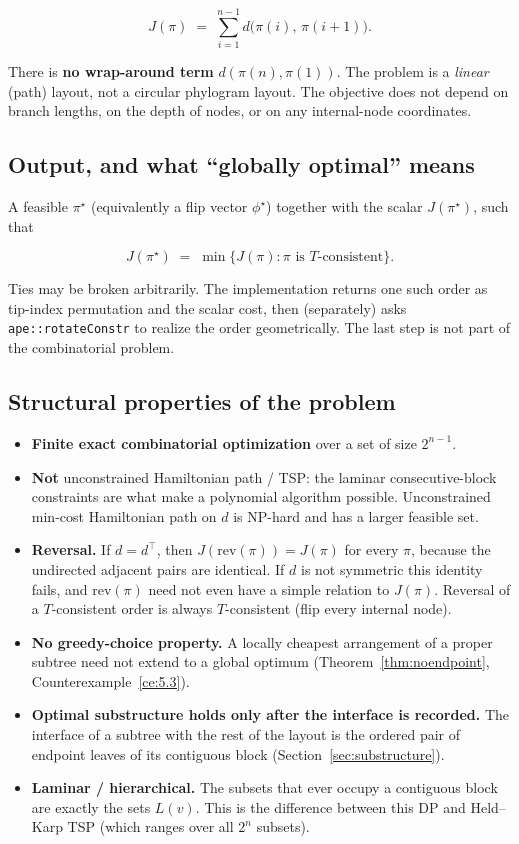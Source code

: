 \documentclass[11pt]{article}
\theoremstyle{plain}
\newcommand{\rev}{\mathrm{rev}}
\begin{document}
\[
J(\pi)
\;=\;
\sum_{i=1}^{n-1} d\bigl(\pi(i),\,\pi(i+1)\bigr).
\]

There is \textbf{no wrap-around term} \(d(\pi(n),\pi(1))\). The problem is a
\emph{linear} (path) layout, not a circular phylogram layout. The objective
does not depend on branch lengths, on the depth of nodes, or on any
internal-node coordinates.

\subsection{Output, and what ``globally optimal'' means}

A feasible \(\pi^\star\) (equivalently a flip vector \(\phi^\star\)) together
with the scalar \(J(\pi^\star)\), such that

\[
J(\pi^\star)
\;=\;
\min\bigl\{ J(\pi) : \pi\text{ is \(T\)-consistent}\bigr\}.
\]

Ties may be broken arbitrarily. The implementation returns one such order as
tip-index permutation and the scalar cost, then (separately) asks
\texttt{ape::rotateConstr} to realize the order geometrically. The last step is
not part of the combinatorial problem.

\subsection{Structural properties of the problem}

\begin{itemize}
\item \textbf{Finite exact combinatorial optimization} over a set of size
  \(2^{n-1}\).
\item \textbf{Not} unconstrained Hamiltonian path / TSP: the laminar
  consecutive-block constraints are what make a polynomial algorithm possible.
  Unconstrained min-cost Hamiltonian path on \(d\) is NP-hard and has a larger
  feasible set.
\item \textbf{Reversal.} If \(d = d^\top\), then \(J(\rev(\pi)) = J(\pi)\) for
  every \(\pi\), because the undirected adjacent pairs are identical. If \(d\)
  is not symmetric this identity fails, and \(\rev(\pi)\) need not even have a
  simple relation to \(J(\pi)\). Reversal of a \(T\)-consistent order is always
  \(T\)-consistent (flip every internal node).
\item \textbf{No greedy-choice property.} A locally cheapest arrangement of a
  proper subtree need not extend to a global optimum
  (Theorem~\ref{thm:noendpoint}, Counterexample~\ref{ce:5.3}).
\item \textbf{Optimal substructure holds only after the interface is recorded.}
  The interface of a subtree with the rest of the layout is the ordered pair of
  endpoint leaves of its contiguous block (Section~\ref{sec:substructure}).
\item \textbf{Laminar / hierarchical.} The subsets that ever occupy a
  contiguous block are exactly the sets \(L(v)\). This is the difference
  between this DP and Held--Karp TSP (which ranges over all \(2^n\) subsets).
\end{itemize}
\end{document}
